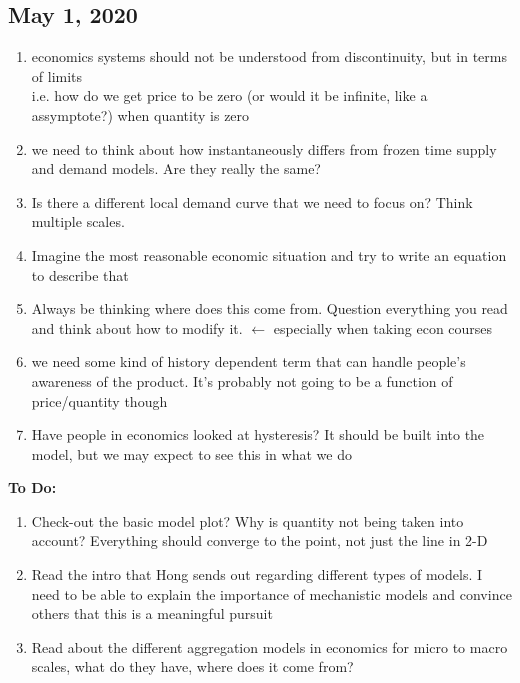 \subsection{May 1, 2020}
\begin{enumerate}
	\item economics systems should not be understood from discontinuity, but in terms of limits 
	\\ i.e. how do we get price to be zero (or would it be infinite, like a assymptote?) when quantity is zero
	\item we need to think about how instantaneously differs from frozen time supply and demand models. Are they really the same?
	\item Is there a different local demand curve that we need to focus on? Think multiple scales.
	\item Imagine the most reasonable economic situation and try to write an equation to describe that
	\item Always be thinking where does this come from. Question everything you read and think about how to modify it. $\leftarrow$ especially when taking econ courses
	\item we need some kind of history dependent term that can handle people's awareness of the product. It's probably not going to be a function of price/quantity though
	\item Have people in economics looked at hysteresis? It should be built into the model, but we may expect to see this in what we do
\end{enumerate}
\textbf{To Do:}
\begin{enumerate}
	\item Check-out the basic model plot? Why is quantity not being taken into account? Everything should converge to the point, not just the line in 2-D
	\item Read the intro that Hong sends out regarding different types of models. I need to be able to explain the importance of mechanistic models and convince others that this is a meaningful pursuit
	\item Read about the different aggregation models in economics for micro to macro scales, what do they have, where does it come from? 
\end{enumerate}



